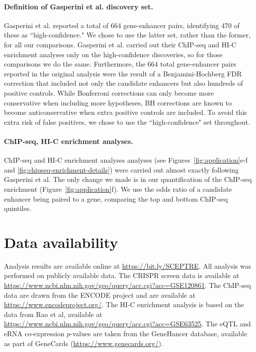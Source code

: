 \documentclass{nature}
\begin{document}
\paragraph{Definition of Gasperini et al. discovery set.}

Gasperini et al. reported a total of 664 gene-enhancer pairs, identifying 470 of these as ``high-confidence." We chose to use the latter set, rather than the former, for all our comparisons. Gasperini et al. carried out their ChIP-seq and HI-C enrichment analyses only on the high-confidence discoveries, so for those comparisons we do the same. Furthermore, the 664 total gene-enhancer pairs reported in the original analysis were the result of a Benjamini-Hochberg FDR correction that included not only the candidate enhancers but also hundreds of positive controls. While Bonferroni corrections can only become more conservative when including more hypotheses, BH corrections are known to become anticonservative when extra positive controls are included\cite{FR01}. To avoid this extra risk of false positives, we chose to use the ``high-confidence" set throughout.

\paragraph{ChIP-seq, HI-C enrichment analyses.}

ChIP-seq and HI-C enrichment analyses analyses (see Figures~\ref{fig:application}e-f and \ref{fig:chipseq-enrichment-details}) were carried out almost exactly following Gasperini et al. The only change we made is in our quantification of the ChIP-seq enrichment (Figure~\ref{fig:application}f). We use the odds ratio of a candidate enhancer being paired to a gene, comparing the top and bottom ChIP-seq quintiles.

\section*{Data availability}

Analysis results are available online at \url{https://bit.ly/SCEPTRE}. All analysis was performed on publicly available data. The CRISPR screen data\cite{Gasperini2019} is available at \url{https://www.ncbi.nlm.nih.gov/geo/query/acc.cgi?acc=GSE120861}. The ChIP-seq data are drawn from the ENCODE project\cite{Dunham2012} and are available at \url{https://www.encodeproject.org/}. The HI-C enrichment analysis is based on the data from Rao et al\cite{Rao2014}, available at \url{https://www.ncbi.nlm.nih.gov/geo/query/acc.cgi?acc=GSE63525}. The eQTL and eRNA co-expression $p$-values are taken from the GeneHancer database\cite{Fishilevich2017}, available as part of GeneCards (\url{https://www.genecards.org/}).
\end{document}
